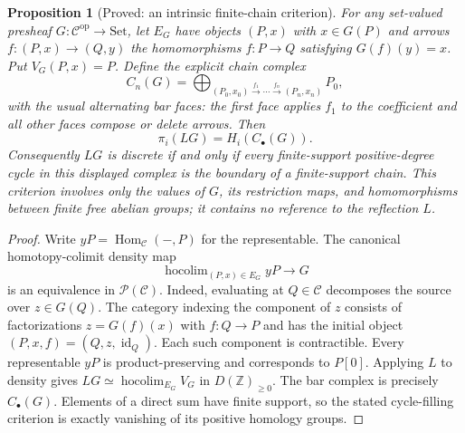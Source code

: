 \documentclass[11pt,a4paper]{article}
\newtheorem{proposition}[theorem]{Proposition}
\theoremstyle{definition}
\begin{document}
\begin{proposition}[Proved: an intrinsic finite-chain criterion]\label{main:reflection-criterion}
For any set-valued presheaf $G:\mathcal C^{\mathrm{op}}\to\mathrm{Set}$,
let $E_G$ have objects $(P,x)$ with $x\in G(P)$ and arrows
$f:(P,x)\to(Q,y)$ the homomorphisms $f:P\to Q$ satisfying
$G(f)(y)=x$. Put $V_G(P,x)=P$. Define the explicit chain complex
\[
 C_n(G)=\bigoplus_{(P_0,x_0)\xrightarrow{f_1}\cdots
                         \xrightarrow{f_n}(P_n,x_n)} P_0,
\]
with the usual alternating bar faces: the first face applies $f_1$ to
the coefficient and all other faces compose or delete arrows. Then
\[
 \pi_i(LG)=H_i(C_\bullet(G)).
\]
Consequently $LG$ is discrete if and only if every finite-support
positive-degree cycle in this displayed complex is the boundary of a
finite-support chain. This criterion involves only the values of $G$,
its restriction maps, and homomorphisms between finite free abelian
groups; it contains no reference to the reflection $L$.
\end{proposition}
\begin{proof}
Write $yP=\operatorname{Hom}_{\mathcal C}(-,P)$ for the representable.
The canonical homotopy-colimit density map
\[
 \operatorname{hocolim}_{(P,x)\in E_G}yP\longrightarrow G
\]
is an equivalence in $\mathcal P(\mathcal C)$. Indeed, evaluating at
$Q\in\mathcal C$ decomposes the source over $z\in G(Q)$. The category
indexing the component of $z$ consists of factorizations
$z=G(f)(x)$ with $f:Q\to P$ and has the initial object
$(P,x,f)=(Q,z,\operatorname{id}_Q)$. Each such component is contractible.
Every representable $yP$ is product-preserving and corresponds to $P[0]$.
Applying $L$ to density gives
$LG\simeq\operatorname{hocolim}_{E_G}V_G$ in $D(\mathbb Z)_{\geq0}$.
The bar complex is precisely $C_\bullet(G)$. Elements of a direct sum
have finite support, so the stated cycle-filling criterion is exactly
vanishing of its positive homology groups.
\end{proof}
\end{document}
